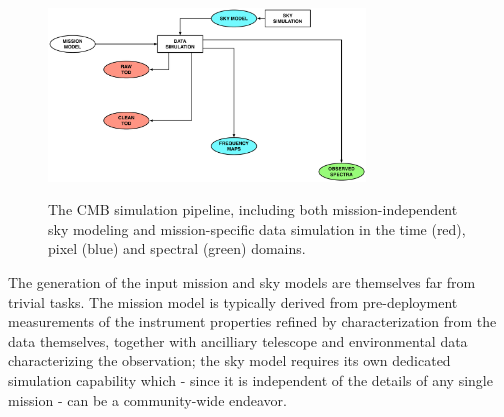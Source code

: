 \begin{figure}[htbp]
\includegraphics[width=0.75\textwidth]{Analysis/sim}\\
\caption{The CMB simulation pipeline, including both mission-independent sky modeling and mission-specific data simulation in the time (red), pixel (blue) and spectral (green) domains.}
\label{fig_sim}
\end{figure}

The generation of the input mission and sky models are themselves far from trivial tasks. The mission model is typically derived from pre-deployment measurements of the instrument properties refined by characterization from the data themselves, together with ancilliary telescope and environmental data characterizing the observation; the sky model requires its own dedicated simulation capability which - since it is independent of the details of any single mission - can be a community-wide endeavor.









%




